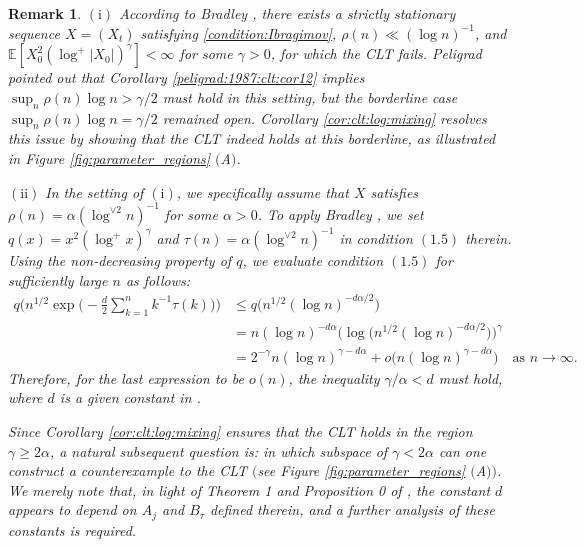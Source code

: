 \documentclass[11pt,a4,leqno]{amsart}
\newtheorem{remark}[lemma]{Remark}
\newcommand{\1}{{\mathbf 1}}
\begin{document}
\begin{remark}
\label{rem:log(n)^(-1)}
\noindent $(\mathrm{i})$ According to Bradley \cite[Corollary 1]{bradley:1987}, there exists a strictly stationary sequence $X=(X_t)$ satisfying \eqref{condition:Ibragimov}, $\rho(n)\ll (\log n)^{-1}$, and $\mathbb{E}[ X_0^2 (\log^+ |X_0|)^\gamma ] <\infty$ for some $\gamma>0$, for which the CLT fails. Peligrad \cite{peligrad:1987} pointed out that Corollary \ref{peligrad:1987:clt:cor12} implies $\sup_{n} \rho(n)\log n > \gamma/2$ must hold in this setting, but the borderline case $\sup_{n} \rho(n)\log n = \gamma/2$ remained open. Corollary \ref{cor:clt:log:mixing} resolves this issue by showing that the CLT indeed holds at this borderline, as illustrated in Figure \ref{fig:parameter_regions} $($A$)$.

\vspace{2mm}
\noindent $(\mathrm{ii})$ In the setting of $(\mathrm{i})$, we specifically assume that $X$ satisfies $\rho(n) = \alpha (\log^{\vee 2} n)^{-1}$ for some $\alpha>0$. To apply Bradley \cite[Theorem 1]{bradley:1987}, we set $q(x) = x^2 (\log^+ x)^\gamma$ and $\tau(n) = \alpha (\log^{\vee 2} n)^{-1}$ in condition $(1.5)$ therein. Using the non-decreasing property of $q$, we evaluate condition $(1.5)$ for sufficiently large $n$ as follows:
\begin{align*}
q\Big( n^{1/2} \exp\Big( -\frac{d}{2} \sum_{k=1}^n k^{-1} \tau(k) \Big) \Big) 
&\le q\big(n^{1/2} (\log n)^{-d\alpha/2}\big) \\
&= n (\log n)^{-d\alpha} \Big( \log \big( n^{1/2} (\log n)^{-d\alpha/2} \big) \Big)^\gamma \\
&= 2^{-\gamma} n (\log n)^{\gamma - d\alpha} + o\big(n (\log n)^{\gamma - d\alpha}\big) \quad \text{as } n \to \infty.
\end{align*}
Therefore, for the last expression to be $o(n)$, the inequality $\gamma/\alpha < d$ must hold, where $d$ is a given constant in \cite[Theorem 1]{bradley:1987}. 

Since Corollary \ref{cor:clt:log:mixing} ensures that the CLT holds in the region $\gamma \ge 2\alpha$, a natural 
subsequent question is: in which subspace of $\gamma < 2\alpha$ can one construct a counterexample to the CLT 
$($see Figure \ref{fig:parameter_regions} $($A$))$. We merely note that, in light of Theorem 1 and Proposition 0 of 
\cite{bradley:1987}, the constant $d$ appears to depend on $A_j$ and $B_\tau$ defined therein, and a further analysis of these constants is required.
\end{remark}
\end{document}

